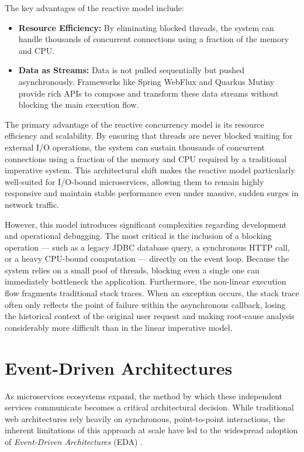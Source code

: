 The key advantages of the reactive model include:
\begin{itemize}
    \item \textbf{Resource Efficiency:} By eliminating blocked threads, the system can handle thousands of concurrent connections using a fraction of the memory and CPU.
    \item \textbf{Data as Streams:} Data is not pulled sequentially but pushed asynchronously. Frameworks like Spring WebFlux and Quarkus Mutiny provide rich APIs to compose and transform these data streams without blocking the main execution flow.
\end{itemize}

The primary advantage of the reactive concurrency model is its resource efficiency and scalability. By ensuring that threads are never blocked waiting for external I/O operations, the system can sustain thousands of concurrent connections using a fraction of the memory and CPU required by a traditional imperative system. This architectural shift makes the reactive model particularly well-suited for I/O-bound microservices, allowing them to remain highly responsive and maintain stable performance even under massive, sudden surges in network traffic.

However, this model introduces significant complexities regarding development and operational debugging. The most critical is the inclusion of a blocking operation — such as a legacy JDBC database query, a synchronous HTTP call, or a heavy CPU-bound computation — directly on the event loop. Because the system relies on a small pool of threads, blocking even a single one can immediately bottleneck the application. Furthermore, the non-linear execution flow fragments traditional stack traces. When an exception occurs, the stack trace often only reflects the point of failure within the asynchronous callback, losing the historical context of the original user request and making root-cause analysis considerably more difficult than in the linear imperative model.


\section{Event-Driven Architectures}
\label{sec:event_driven_architectures}

As microservices ecosystems expand, the method by which these independent services communicate becomes a critical architectural decision. While traditional web architectures rely heavily on synchronous, point-to-point interactions, the inherent limitations of this approach at scale have led to the widespread adoption of \textit{Event-Driven Architectures} (\gls{EDA}) \cite{ibm_eda_2024}. 

